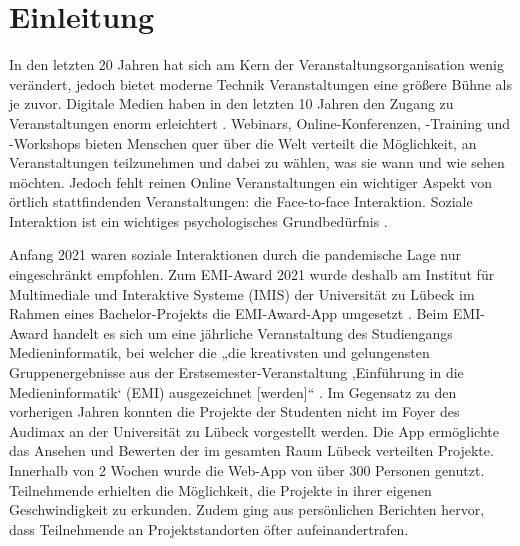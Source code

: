 \chapter{Einleitung}

In den letzten 20 Jahren hat sich am Kern der Veranstaltungsorganisation wenig
verändert, jedoch bietet moderne Technik Veranstaltungen eine größere Bühne als
je zuvor. Digitale Medien haben in den letzten 10 Jahren den Zugang zu
Veranstaltungen enorm erleichtert \cite{Bladen2017}. Webinars,
Online-Konferenzen, -Training und -Workshops bieten Menschen quer über die Welt
verteilt die Möglichkeit, an Veranstaltungen teilzunehmen und dabei zu wählen,
was sie wann und wie sehen möchten. Jedoch fehlt reinen Online Veranstaltungen
ein wichtiger Aspekt von örtlich stattfindenden Veranstaltungen: die
Face-to-face Interaktion. Soziale Interaktion ist ein wichtiges
psychologisches Grundbedürfnis \cite{Maslow1943}.

Anfang 2021 waren soziale Interaktionen durch die pandemische Lage nur
eingeschränkt empfohlen. Zum EMI-Award 2021 wurde deshalb am Institut für
Multimediale und Interaktive Systeme (IMIS) der Universität zu Lübeck im Rahmen
eines Bachelor-Projekts die EMI-Award-App umgesetzt \cite{Canzler2021}. Beim EMI-Award handelt es sich um eine jährliche
Veranstaltung des Studiengangs Medieninformatik, bei welcher die „die
kreativsten und gelungensten Gruppenergebnisse aus der
Erstsemester-Veranstaltung ‚Einführung in die Medieninformatik‘ (EMI)
ausgezeichnet [werden]“ \cite{UniversitatzuLubeck2021}. Im
Gegensatz zu den vorherigen Jahren konnten die Projekte der Studenten nicht im
Foyer des Audimax an der Universität zu Lübeck vorgestellt werden. Die App
ermöglichte das Ansehen und Bewerten der im gesamten Raum Lübeck verteilten
Projekte. Innerhalb von 2 Wochen wurde die Web-App von über 300
Personen genutzt. Teilnehmende erhielten die Möglichkeit, die Projekte in ihrer
eigenen Geschwindigkeit zu erkunden. Zudem ging aus persönlichen Berichten
hervor, dass Teilnehmende an Projektstandorten öfter aufeinandertrafen.


